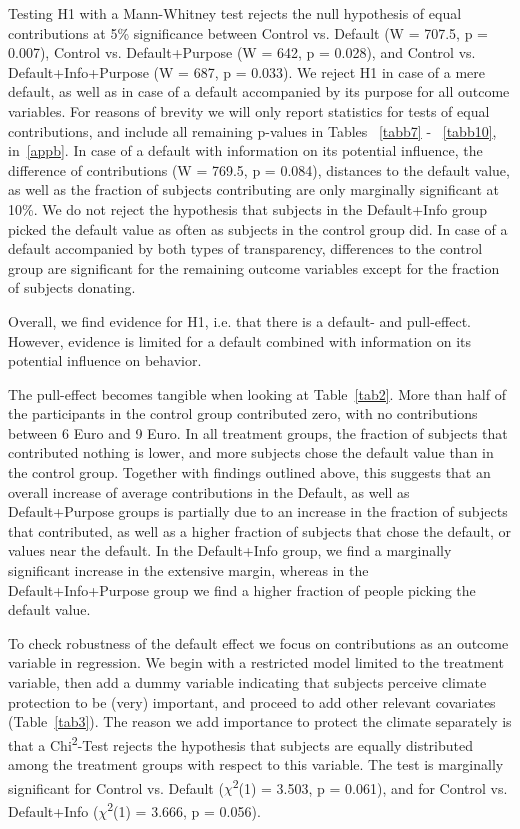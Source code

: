 \documentclass[review, authoryear,12pt]{elsarticle}
\begin{document}
Testing H1 with a Mann-Whitney test rejects the null hypothesis of equal contributions at 5\% significance between Control vs. Default (W = 707.5, p = 0.007), Control vs. Default+Purpose (W = 642, p = 0.028), and Control vs. Default+Info+Purpose (W = 687, p = 0.033). We reject H1 in case of a mere default, as well as in case of a default accompanied by its purpose for all outcome variables. For reasons of brevity we will only report statistics for tests of equal contributions, and include all remaining p-values in Tables ~\ref{tabb7} - ~\ref{tabb10}, in~\ref{appb}. In case of a default with information on its potential influence, the difference of contributions (W = 769.5, p = 0.084), distances to the default value, as well as the fraction of subjects contributing are only marginally significant at 10\%. We do not reject the hypothesis that subjects in the Default+Info group picked the default value as often as subjects in the control group did. In case of a default accompanied by both types of transparency, differences to the control group are significant for the remaining outcome variables except for the fraction of subjects donating.

Overall, we find evidence for H1, i.e. that there is a default- and pull-effect. However, evidence is limited for a default combined with information on its potential influence on behavior.

The pull-effect becomes tangible when looking at Table~\ref{tab2}. More than half of the participants in the control group contributed zero, with no contributions between 6 Euro and 9 Euro. In all treatment groups, the fraction of subjects that contributed nothing is lower, and more subjects chose the default value than in the control group. Together with findings outlined above, this suggests that an overall increase of average contributions in the Default, as well as Default+Purpose groups is partially due to an increase in the fraction of subjects that contributed, as well as a higher fraction of subjects that chose the default, or values near the default. In the Default+Info group, we find a marginally significant increase in the extensive margin, whereas in the Default+Info+Purpose group we find a higher fraction of people picking the default value.

To check robustness of the default effect we focus on contributions as an outcome variable in regression. We begin with a restricted model limited to the treatment variable, then add a dummy variable indicating that subjects perceive climate protection to be (very) important, and proceed to add other relevant covariates (Table~\ref{tab3}). The reason we add importance to protect the climate separately is that a Chi\textsuperscript{2}-Test rejects the hypothesis that subjects are equally distributed among the treatment groups with respect to this variable. The test is marginally significant for Control vs. Default ($\chi$\textsuperscript{2}(1) = 3.503, p = 0.061), and for Control vs. Default+Info ($\chi$\textsuperscript{2}(1) = 3.666, p = 0.056).
\end{document}

